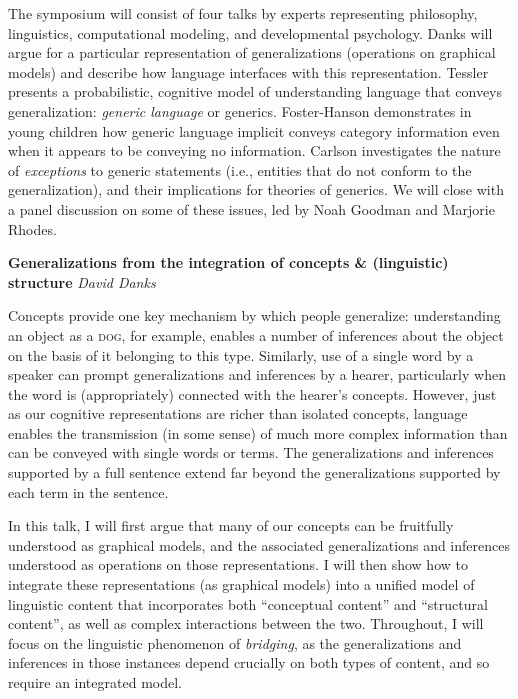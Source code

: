 \documentclass[10pt,letterpaper]{article}
\begin{document}
The symposium will consist of four talks by experts representing philosophy, linguistics, computational modeling, and developmental psychology.    
Danks will argue for a particular representation of generalizations (operations on graphical models) and describe how language interfaces with this representation.
 Tessler presents a probabilistic, cognitive model of understanding language that conveys generalization: \emph{generic language} or generics.
 Foster-Hanson demonstrates in young children how generic language implicit conveys category information even when it appears to be conveying no information.
 Carlson investigates the nature of \emph{exceptions} to generic statements (i.e., entities that do not conform to the generalization), and their implications for theories of generics.
We will close with a panel discussion on some of these issues, led by Noah Goodman and Marjorie Rhodes.

\noindent\textbf{Generalizations from the integration of concepts \& (linguistic) structure} 
\noindent\emph{David Danks}

Concepts provide one key mechanism by which people generalize: understanding an object as a \textsc{dog}, for example, enables a number of inferences about the object on the basis of it belonging to this type. 
Similarly, use of a single word by a speaker can prompt generalizations and inferences by a hearer, particularly when the word is (appropriately) connected with the hearer's concepts. 
However, just as our cognitive representations are richer than isolated concepts, language enables the transmission (in some sense) of much more complex information than can be conveyed with single words or terms. 
The generalizations and inferences supported by a full sentence extend far beyond the generalizations supported by each term in the sentence. 

In this talk, I will first argue that many of our concepts can be fruitfully understood as graphical models, and the associated generalizations and inferences understood as operations on those representations. 
I will then show how to integrate these representations (as graphical models) into a unified model of linguistic content that incorporates both ``conceptual content'' and ``structural content'', as well as complex interactions between the two. 
Throughout, I will focus on the linguistic phenomenon of \emph{bridging}, as the generalizations and inferences in those instances depend crucially on both types of content, and so require an integrated model.
\end{document}
